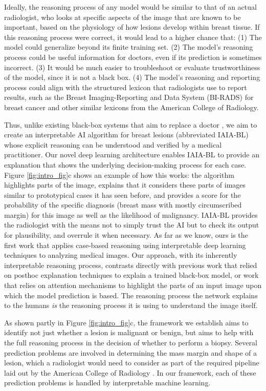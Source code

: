 \documentclass[11pt]{article}
\begin{document}
Ideally, the reasoning process of any model would be similar to that of an actual radiologist, who looks at specific aspects of the image that are known to be important, based on the physiology of how lesions develop within breast tissue. If this reasoning process were correct, it would lead to a higher chance that: (1) The model could generalize beyond its finite training set. (2) The model's reasoning process could be useful information for doctors, even if its prediction is sometimes incorrect. (3) It would be much easier to troubleshoot or evaluate trustworthiness of the model, since it is not a black box. (4) The model's reasoning and reporting process could align with the structured lexicon that radiologists use to report results, such as the Breast Imaging-Reporting and Data System (BI-RADS) \citep{sickles2013acr} for breast cancer and other similar lexicons from the American College of Radiology.

Thus, unlike existing black-box systems that aim to replace a doctor \citep{mckinney2020international}, we aim to create an interpretable AI algorithm for breast lesions (abbreviated IAIA-BL) whose explicit reasoning can be understood and verified by a medical practitioner. Our novel deep learning architecture enables IAIA-BL to provide an explanation that shows the underlying decision-making process for each case. Figure \ref{fig:intro_fig}c shows an example of how this works: the algorithm highlights parts of the image, explains that it considers these parts of images similar to prototypical cases it has seen before, and provides a score for the probability of the specific diagnosis (breast mass with mostly circumscribed margin) for this image as well as the likelihood of malignancy. IAIA-BL provides the radiologist with the means not to simply trust the AI but to check its output for plausibility, and overrule it when necessary. 
As far as we know, ours is the first work that applies case-based reasoning using interpretable deep learning techniques to analyzing medical images. Our approach, with its inherently interpretable reasoning process, contrasts directly with previous work that relied on posthoc explanation techniques to explain a trained black-box model, or work that relies on attention mechanisms to highlight the parts of an input image upon which the model prediction is based. 
The reasoning process the network explains to the humans \textit{is} the reasoning process it is using to understand the image itself. 

As shown partly in Figure \ref{fig:intro_fig}c, the framework we establish aims to identify not just whether a lesion is malignant or benign, but aims to help with the full reasoning process in the decision of whether to perform a biopsy. Several prediction problems are involved in determining the mass margin and shape of a lesion, which a radiologist would need to consider as part of the required pipeline laid out by the American College of Radiology \citep{sickles2013acr}. In our framework, each of these prediction problems is handled by interpretable machine learning.
\end{document}

